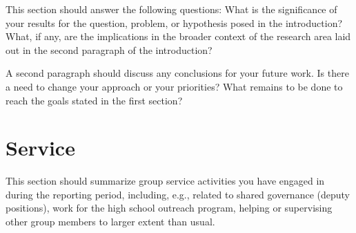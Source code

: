 \documentclass[11pt]{article}
\begin{document}
This section should answer the following questions:
What is the significance of your results for the question, problem, or
hypothesis posed in the introduction? What, if any, are the
implications in the broader context of the research area laid out in the
second paragraph of the introduction? 

A second paragraph should discuss any conclusions for your future work. 
Is there a need to change your approach or your priorities? What remains
to be done to reach the goals stated in the first section? 

\section{Service}

This section should summarize group service activities you have engaged
in during the reporting period, including, e.g., related to shared
governance (deputy positions), work for the high school outreach
program, helping or supervising other group members to larger extent
than usual.

\printbibliography
\end{document}
